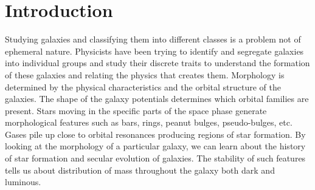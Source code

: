 \documentclass[a4paper,12pt]{report}
\begin{document}
\newpage
\thispagestyle{empty}
\tableofcontents
\thispagestyle{empty}
\listoffigures
\thispagestyle{empty}
\listoftables
\thispagestyle{empty}
\newpage	
{}
\chapter{Introduction}
\hspace*{0.5 in}Studying galaxies and classifying them into different classes is a problem not of ephemeral nature. Physicists have been trying to identify and segregate galaxies into individual groups and study their discrete traits to understand the formation of these galaxies and relating the physics that creates them. Morphology is determined by the physical characteristics and the orbital structure of the galaxies. The shape of the galaxy potentials determines which orbital families are present. Stars moving in the specific parts of the space phase generate morphological features such as bars, rings, peanut bulges, pseudo-bulges, etc. Gases pile up close to orbital resonances producing regions of star formation. By looking at the morphology of a particular galaxy, we can learn about the history of star formation and secular evolution of galaxies. The stability of such features tells us about distribution of mass throughout the galaxy both dark and luminous.
\end{document}
